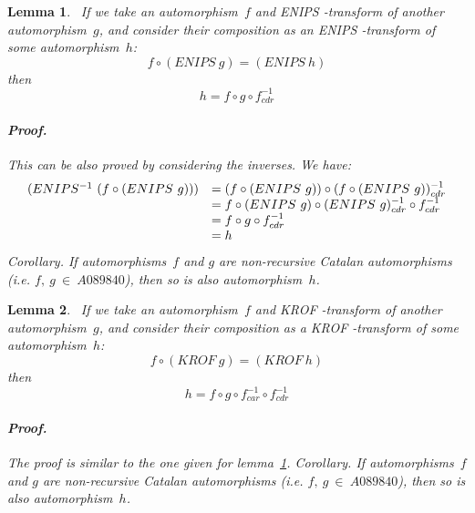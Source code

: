 \documentclass[11pt]{article} %
\newtheorem{lemma}{Lemma}
\newcommand{\eeq}{\end{equation}}
\newcommand{\beql}[1]{\begin{equation}\label{#1}}
\newcommand{\autletter}[1]{$#1$}
\newcommand{\automorphismlet}[1]{automorphism~\autletter{#1}}
\def\automorphismlets2#1#2{automorphisms~\autletter{#1} and \autletter{#2}}
\newcommand{\funapply}{\ensuremath{\circ}}
\begin{document}
\begin{lemma}~\label{lemma_composing_f_and_ENIPS_g}
\normalfont
If we take an %
\automorphismlet{f}
and ENIPS -transform of another %
\automorphismlet{g},
and consider their composition as an ENIPS -transform of
some \automorphismlet{h}:
\beql{composing_f_and_ENIPS_g}
f \funapply (ENIPS~g) = (ENIPS~h)
\eeq
then
\beql{implication_of_composing_f_and_ENIPS_g}
h = f \funapply g \funapply f^{-1}_{cdr}
\eeq

\paragraph{\textit{Proof.}}
This can be also proved by considering the inverses.
We have:
\beql{proof_of_composing_f_and_ENIPS_g}
\begin{array}{l l}
(ENIPS^{-1}~(f \funapply (ENIPS~g))) & = (f \funapply (ENIPS~g)) \funapply (f \funapply (ENIPS~g))^{-1}_{cdr} \\
 & = f \funapply (ENIPS~g) \funapply (ENIPS~g)^{-1}_{cdr} \funapply f^{-1}_{cdr} \\
 & = f \funapply g \funapply f^{-1}_{cdr} \\
 & = h \\
\end{array}
\eeq
\textit{Corollary}. If \automorphismlets2{f}{g} %
are {\em non-recursive} Catalan automorphisms
(i.e. $f,~g~\in~A089840$), then so is also \automorphismlet{h}.
\end{lemma}

\begin{lemma}~\label{lemma_composing_f_and_KROF_g}
\normalfont
If we take an %
\automorphismlet{f}
and KROF -transform of another %
\automorphismlet{g},
and consider their composition as a KROF -transform of
some \automorphismlet{h}:
\beql{composing_f_and_KROF_g}
f \funapply (KROF~g) = (KROF~h)
\eeq
then
\beql{implication_of_composing_f_and_KROF_g}
h = f \funapply g \funapply f^{-1}_{car} \funapply f^{-1}_{cdr}
\eeq

\paragraph{\textit{Proof.}}
The proof is similar to the one given for lemma~\ref{lemma_composing_f_and_ENIPS_g}. %
\textit{Corollary}. If \automorphismlets2{f}{g} %
are {\em non-recursive} Catalan automorphisms
(i.e. $f,~g~\in~A089840$), then so is also \automorphismlet{h}.
\end{lemma}
\end{document}
